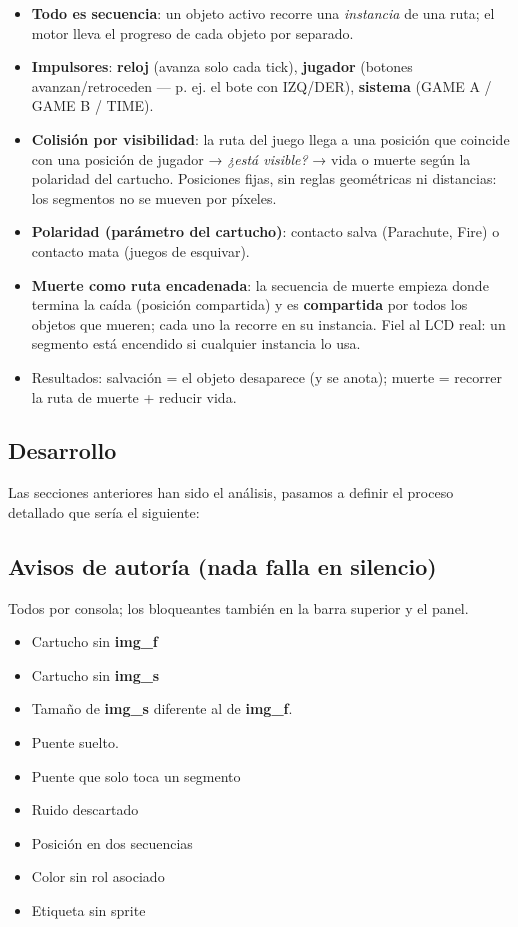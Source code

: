 \begin{itemize}
	\item \textbf{Todo es secuencia}: un objeto activo recorre una \textit{instancia} de una ruta; el motor lleva el progreso de cada objeto por separado.
	\item \textbf{Impulsores}: \textbf{reloj} (avanza solo cada tick), \textbf{jugador} (botones avanzan/retroceden — p. ej. el bote con IZQ/DER), \textbf{sistema} (GAME A / GAME B / TIME).
	\item \textbf{Colisión por visibilidad}: la ruta del juego llega a una posición que coincide con una posición de jugador → \textit{¿está visible?} → vida o muerte según la polaridad del cartucho. Posiciones fijas, sin reglas geométricas ni distancias: los segmentos no se mueven por píxeles.
	\item \textbf{Polaridad (parámetro del cartucho)}: contacto salva (Parachute, Fire) o contacto mata (juegos de esquivar).
	\item \textbf{Muerte como ruta encadenada}: la secuencia de muerte empieza donde termina la caída (posición compartida) y es \textbf{compartida} por todos los objetos que mueren; cada uno la recorre en su instancia. Fiel al LCD real: un segmento está encendido si cualquier instancia lo usa.
	\item Resultados: salvación = el objeto desaparece (y se anota); muerte = recorrer la ruta de muerte + reducir vida.
\end{itemize}

\subsection{Desarrollo}

Las secciones anteriores han sido el análisis, pasamos a definir el proceso detallado que sería el siguiente:


\subsection{Avisos de autoría (nada falla en silencio)}

Todos por consola; los bloqueantes también en la barra superior y el panel.

\begin{itemize}
	\item Cartucho sin \textbf{img\_f}
	\item Cartucho sin \textbf{img\_s}
	\item Tamaño de \textbf{img\_s} diferente al de \textbf{img\_f}. 
	\item Puente suelto.
	\item Puente que solo toca un segmento
	\item Ruido descartado
	\item Posición en dos secuencias
	\item Color sin rol asociado
	\item Etiqueta sin sprite

\end{itemize}

